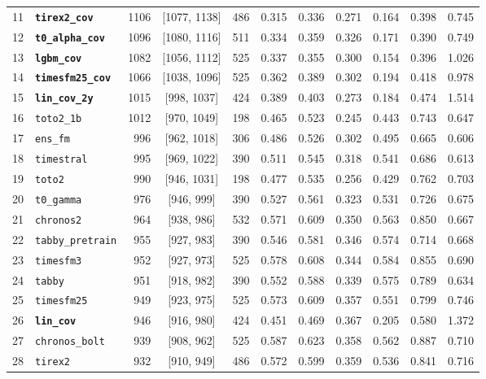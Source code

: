 \documentclass[11pt,a4paper]{article}
\begin{document}
\begin{table}[!t]
\begin{threeparttable}
\begin{tabular}{@{}rlrcrrrrrrr@{}}
    11 & \texttt{\textbf{tirex2\_cov}} & 1106 & [1077, 1138] & 486 & 0.315 & 0.336 & 0.271 & 0.164 & 0.398 & 0.745 \\
    12 & \texttt{\textbf{t0\_alpha\_cov}} & 1096 & [1080, 1116] & 511 & 0.334 & 0.359 & 0.326 & 0.171 & 0.390 & 0.749 \\
    13 & \texttt{\textbf{lgbm\_cov}} & 1082 & [1056, 1112] & 525 & 0.337 & 0.355 & 0.300 & 0.154 & 0.396 & 1.026 \\
    14 & \texttt{\textbf{timesfm25\_cov}} & 1066 & [1038, 1096] & 525 & 0.362 & 0.389 & 0.302 & 0.194 & 0.418 & 0.978 \\
    15 & \texttt{\textbf{lin\_cov\_2y}} & 1015 & [998, 1037] & 424 & 0.389 & 0.403 & 0.273 & 0.184 & 0.474 & 1.514 \\
    16 & \texttt{toto2\_1b} & 1012 & [970, 1049] & 198 & 0.465 & 0.523 & 0.245 & 0.443 & 0.743 & 0.647 \\
    17 & \texttt{ens\_fm} & 996 & [962, 1018] & 306 & 0.486 & 0.526 & 0.302 & 0.495 & 0.665 & 0.606 \\
    18 & \texttt{timestral} & 995 & [969, 1022] & 390 & 0.511 & 0.545 & 0.318 & 0.541 & 0.686 & 0.613 \\
    19 & \texttt{toto2} & 990 & [946, 1031] & 198 & 0.477 & 0.535 & 0.256 & 0.429 & 0.762 & 0.703 \\
    20 & \texttt{t0\_gamma} & 976 & [946, 999] & 390 & 0.527 & 0.561 & 0.323 & 0.531 & 0.726 & 0.675 \\
    21 & \texttt{chronos2} & 964 & [938, 986] & 532 & 0.571 & 0.609 & 0.350 & 0.563 & 0.850 & 0.667 \\
    22 & \texttt{tabby\_pretrain} & 955 & [927, 983] & 390 & 0.546 & 0.581 & 0.346 & 0.574 & 0.714 & 0.668 \\
    23 & \texttt{timesfm3} & 952 & [927, 973] & 525 & 0.578 & 0.608 & 0.344 & 0.584 & 0.855 & 0.690 \\
    24 & \texttt{tabby} & 951 & [918, 982] & 390 & 0.552 & 0.588 & 0.339 & 0.575 & 0.789 & 0.634 \\
    25 & \texttt{timesfm25} & 949 & [923, 975] & 525 & 0.573 & 0.609 & 0.357 & 0.551 & 0.799 & 0.746 \\
    26 & \texttt{\textbf{lin\_cov}} & 946 & [916, 980] & 424 & 0.451 & 0.469 & 0.367 & 0.205 & 0.580 & 1.372 \\
    27 & \texttt{chronos\_bolt} & 939 & [908, 962] & 525 & 0.587 & 0.623 & 0.358 & 0.562 & 0.887 & 0.710 \\
    28 & \texttt{tirex2} & 932 & [910, 949] & 486 & 0.572 & 0.599 & 0.359 & 0.536 & 0.841 & 0.716 \\

\end{tabular}
\end{threeparttable}
\end{table}
\end{document}
